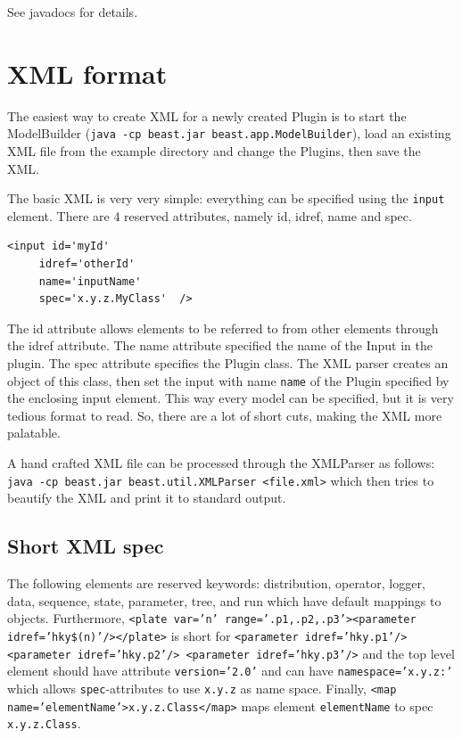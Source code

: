 \documentclass{article}
\begin{document}
See javadocs for details.


\section{XML format\label{sec.xml}}

The easiest way to create XML for a newly created Plugin is to start the ModelBuilder
({\tt java -cp beast.jar beast.app.ModelBuilder}), load an existing XML file
from the example directory and change the Plugins, then save the XML.

The basic XML is very very simple: everything can be specified using
the {\tt input} element. There are 4 reserved attributes, namely id, idref, 
name and spec.

\begin{verbatim}<input id='myId'
     idref='otherId'
     name='inputName'
     spec='x.y.z.MyClass'  />
\end{verbatim}

The id attribute allows elements to be referred to from other elements through
the idref attribute. The name attribute specified the name of the Input in the
plugin. The spec attribute specifies the Plugin class. The XML parser creates
an object of this class, then set the input with name {\tt name} of the Plugin
specified by the enclosing input element. This way every model can be 
specified, but it is very tedious format to read. So, there are a lot of 
short cuts, making the XML more palatable.

A hand crafted XML file can be processed through the XMLParser as follows:
{\tt java -cp beast.jar beast.util.XMLParser <file.xml>} which then 
tries to beautify the XML and print it to standard output.

\subsection{Short XML spec}
The following elements are reserved keywords:
distribution, operator, logger, data, sequence, state, parameter, tree, and run
which have default mappings to objects.
Furthermore, {\tt <plate var='n' range='.p1,.p2,.p3'><parameter idref='hky\$(n)'/></plate>}
is short for 
{\tt <parameter idref='hky.p1'/>
<parameter idref='hky.p2'/>
<parameter idref='hky.p3'/>}
and the top level element should have attribute {\tt version='2.0'}
and can have {\tt namespace='x.y.z:'} which allows {\tt spec}-attributes
to use {\tt x.y.z} as name space. Finally, {\tt <map name='elementName'>x.y.z.Class</map>}
maps element {\tt elementName} to spec {\tt x.y.z.Class}.
\end{document}
